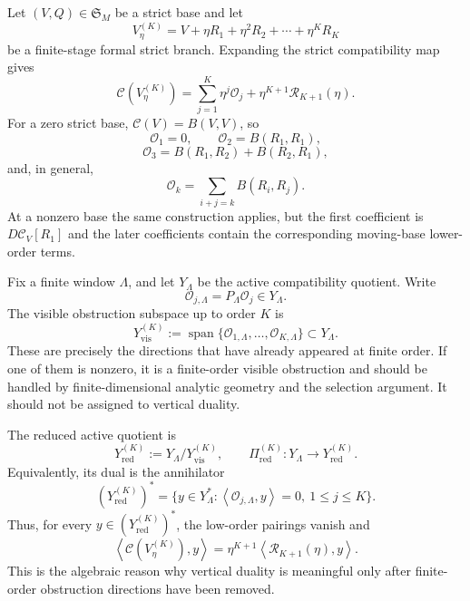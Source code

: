\documentclass[11pt]{article}
\numberwithin{equation}{section}
\newcommand{\ip}[2]{\left\langle #1,#2\right\rangle}
\newcommand{\calC}{\mathcal C}
\newcommand{\calO}{\mathcal O}
\newcommand{\calR}{\mathcal R}
\newcommand{\frakS}{\mathfrak S}
\begin{document}
Let \((V,Q)\in\frakS_M\) be a strict base and let
\[
V_\eta^{(K)}=V+\eta R_1+\eta^2R_2+\cdots+\eta^K R_K
\]
be a finite-stage formal strict branch.  Expanding the strict compatibility map gives
\begin{equation}\label{eq:compat-expansion-K}
\calC(V_\eta^{(K)})=
\sum_{j=1}^{K}\eta^j\calO_j+
\eta^{K+1}\calR_{K+1}(\eta).
\end{equation}
For a zero strict base, \(\calC(V)=B(V,V)\), so
\[
\calO_1=0,
\qquad
\calO_2=B(R_1,R_1),
\]
\[
\calO_3=B(R_1,R_2)+B(R_2,R_1),
\]
and, in general,
\begin{equation}\label{eq:Ok-zero-shadow}
\calO_k=\sum_{i+j=k}B(R_i,R_j).
\end{equation}
At a nonzero base the same construction applies, but the first coefficient is
\(D\calC_V[R_1]\) and the later coefficients contain the corresponding moving-base lower-order terms.

Fix a finite window \(\Lambda\), and let \(Y_\Lambda\) be the active compatibility quotient.  Write
\[
\calO_{j,\Lambda}=P_\Lambda\calO_j\in Y_\Lambda.
\]
The visible obstruction subspace up to order \(K\) is
\begin{equation}\label{eq:YvisK}
Y_{\mathrm{vis}}^{(K)}
:=
\operatorname{span}\{\calO_{1,\Lambda},\ldots,\calO_{K,\Lambda}\}
\subset Y_\Lambda.
\end{equation}
These are precisely the directions that have already appeared at finite order.  If one of them is nonzero, it is a finite-order visible obstruction and should be handled by finite-dimensional analytic geometry and the selection argument.  It should not be assigned to vertical duality.

The reduced active quotient is
\begin{equation}\label{eq:YredK}
Y_{\mathrm{red}}^{(K)}:=Y_\Lambda/Y_{\mathrm{vis}}^{(K)},
\qquad
\Pi_{\mathrm{red}}^{(K)}:Y_\Lambda\to Y_{\mathrm{red}}^{(K)}.
\end{equation}
Equivalently, its dual is the annihilator
\begin{equation}\label{eq:YredK-dual}
(Y_{\mathrm{red}}^{(K)})^*
=
\{y\in Y_\Lambda^*:
\ip{\calO_{j,\Lambda}}{y}=0,
\ 1\le j\le K\}.
\end{equation}
Thus, for every \(y\in (Y_{\mathrm{red}}^{(K)})^*\), the low-order pairings vanish and
\begin{equation}\label{eq:low-order-annihilation}
\ip{\calC(V_\eta^{(K)})}{y}
=
\eta^{K+1}\ip{\calR_{K+1}(\eta)}{y}.
\end{equation}
This is the algebraic reason why vertical duality is meaningful only after finite-order obstruction directions have been removed.
\end{document}
